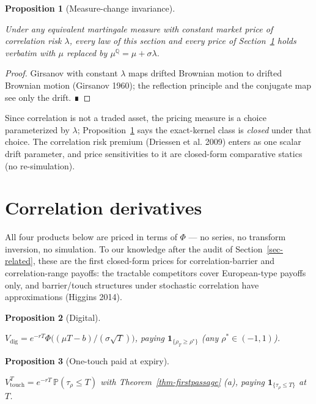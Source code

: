 \documentclass[
  english,
  10pt,
  letterpaper,
  DIV=11,
  numbers=noendperiod]{scrartcl}
\theoremstyle{plain}
\theoremstyle{plain}
\newtheorem{proposition}{Proposition}[section]
\theoremstyle{plain}
\theoremstyle{plain}
\theoremstyle{definition}
\theoremstyle{remark}
\begin{document}
\begin{proposition}[Measure-change
invariance]\protect\hypertarget{prp-measurechange}{}\label{prp-measurechange}

Under any equivalent martingale measure with constant market price of
correlation risk \(\lambda\), every law of this section and every price
of Section~\ref{sec-derivatives} holds verbatim with \(\mu\) replaced by
\(\mu^{\mathbb Q}=\mu+\sigma\lambda\).

\end{proposition}

\begin{proof}
Girsanov with constant \(\lambda\) maps drifted Brownian motion to
drifted Brownian motion (Girsanov 1960); the reflection principle and
the conjugate map see only the drift. ∎
\end{proof}

Since correlation is not a traded asset, the pricing measure is a choice
parameterized by \(\lambda\); Proposition~\ref{prp-measurechange} says
the exact-kernel class is \emph{closed} under that choice. The
correlation risk premium (Driessen et al. 2009) enters as one scalar
drift parameter, and price sensitivities to it are closed-form
comparative statics (no re-simulation).

\section{Correlation derivatives}\label{sec-derivatives}

All four products below are priced in terms of \(\Phi\) --- no series,
no transform inversion, no simulation. To our knowledge after the audit
of Section~\ref{sec-related}, these are the first closed-form prices for
correlation-barrier and correlation-range payoffs: the tractable
competitors cover European-type payoffs only, and barrier/touch
structures under stochastic correlation have approximations (Higgins
2014).

\begin{proposition}[Digital]\protect\hypertarget{prp-digital}{}\label{prp-digital}

\(V_{\mathrm{dig}}=e^{-rT}\Phi\!\big((\mu T-b)/(\sigma\sqrt T)\big)\),
paying \(\mathbf 1_{\{\rho_T\ge\rho^{*}\}}\) (any
\(\rho^{*}\in(-1,1)\)).

\end{proposition}

\begin{proposition}[One-touch paid at
expiry]\protect\hypertarget{prp-touch}{}\label{prp-touch}

\(V_{\mathrm{touch}}^{T}=e^{-rT}\,\mathbb P(\tau_\rho\le T)\) with
Theorem~\ref{thm-firstpassage} (a), paying
\(\mathbf 1_{\{\tau_\rho\le T\}}\) at \(T\).

\end{proposition}
\end{document}
